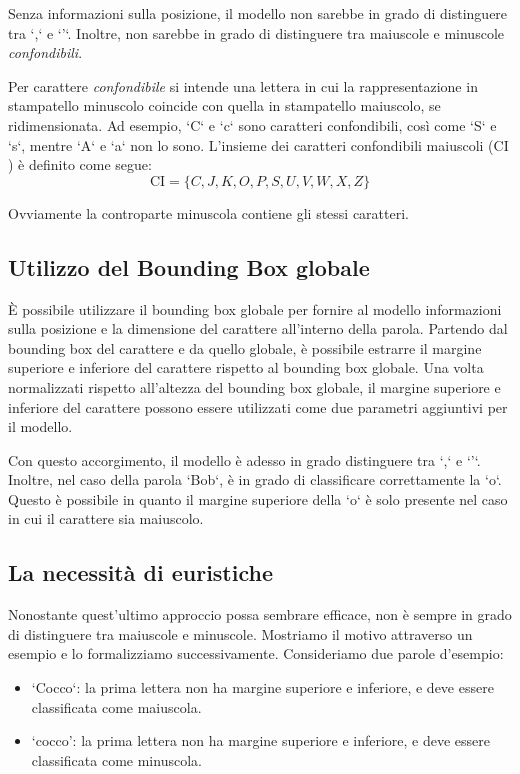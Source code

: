 Senza informazioni sulla posizione, il modello non sarebbe in grado di distinguere tra `,` e `'`. Inoltre, non sarebbe in grado di distinguere tra maiuscole e minuscole \emph{confondibili}.
\newline

Per carattere \emph{confondibile} si intende una lettera in cui la rappresentazione in stampatello minuscolo coincide con quella in stampatello maiuscolo, se ridimensionata. Ad esempio, `C` e `c` sono caratteri confondibili, così come `S` e `s`, mentre `A` e `a` non lo sono.
L'insieme dei caratteri confondibili maiuscoli ($\text{CI}$) è definito come segue:
$$\text{CI} = \{C, J, K, O, P, S, U, V, W, X, Z\}$$

Ovviamente la controparte minuscola contiene gli stessi caratteri.

\subsection{Utilizzo del Bounding Box globale}

È possibile utilizzare il bounding box globale per fornire al modello informazioni sulla posizione e la dimensione del carattere all'interno della parola. Partendo dal bounding box del carattere e da quello globale, è possibile estrarre il margine superiore e inferiore del carattere rispetto al bounding box globale. Una volta normalizzati rispetto all'altezza del bounding box globale, il margine superiore e inferiore del carattere possono essere utilizzati come due parametri aggiuntivi per il modello.

Con questo accorgimento, il modello è adesso in grado distinguere tra `,` e `'`. Inoltre, nel caso della parola `Bob`, è in grado di classificare correttamente la `o`. Questo è possibile in quanto il margine superiore della `o` è solo presente nel caso in cui il carattere sia maiuscolo.

\subsection{La necessità di euristiche}

Nonostante quest'ultimo approccio possa sembrare efficace, non è sempre in grado di distinguere tra maiuscole e minuscole.
Mostriamo il motivo attraverso un esempio e lo formalizziamo successivamente.
Consideriamo due parole d'esempio:
\begin{itemize}
	\item `Cocco`: la prima lettera non ha margine superiore e inferiore, e deve essere classificata come maiuscola.
	\item `cocco': la prima lettera non ha margine superiore e inferiore, e deve essere classificata come minuscola.
\end{itemize}

